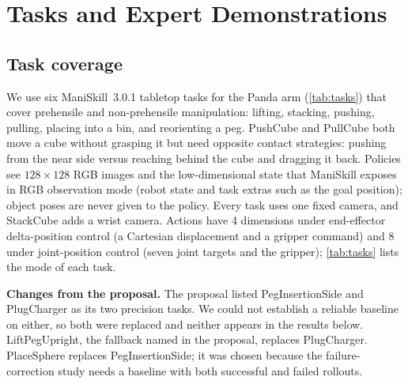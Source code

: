 \section{Tasks and Expert Demonstrations}
\label{sec:data}
\subsection{Task coverage}
We use six ManiSkill~3.0.1 tabletop tasks for the Panda arm (\cref{tab:tasks})
that cover
prehensile and non-prehensile manipulation: lifting, stacking, pushing,
pulling, placing into a bin, and reorienting a peg. PushCube and PullCube
both move a cube without grasping it but need opposite contact strategies:
pushing from the near side versus reaching behind the cube and dragging it
back. Policies see
$128\times128$ RGB images and the low-dimensional state that ManiSkill
exposes in RGB observation mode (robot state and task extras such as the goal
position); object poses are never given to the policy. Every task uses one
fixed camera, and StackCube adds a wrist camera. Actions have 4 dimensions
under end-effector delta-position control (a Cartesian displacement and a
gripper command) and 8 under joint-position control (seven joint targets and
the gripper); \cref{tab:tasks} lists the mode of each task.

\textbf{Changes from the proposal.} The proposal listed PegInsertionSide and
PlugCharger as its two precision tasks. We could not establish a reliable
baseline on either, so both were replaced and neither appears in the results
below. LiftPegUpright, the fallback named in the proposal, replaces
PlugCharger. PlaceSphere replaces PegInsertionSide; it was chosen because the
failure-correction study needs a baseline with both successful and failed
rollouts.


